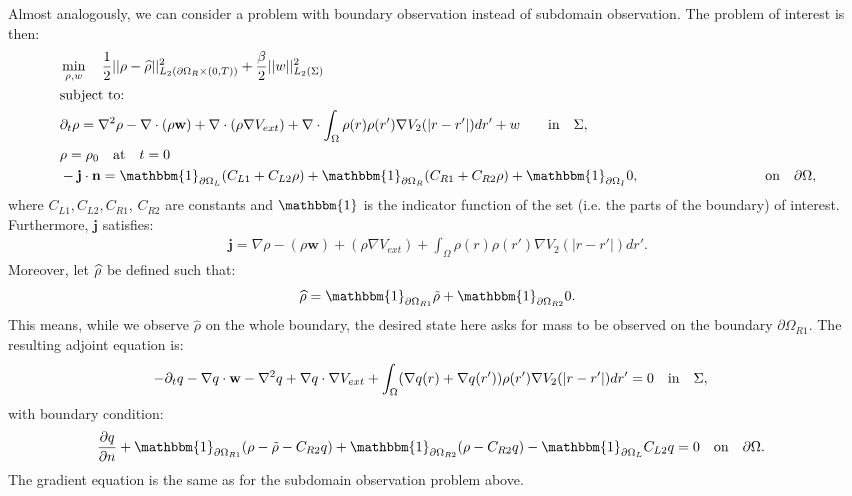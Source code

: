 
Almost analogously, we can consider a problem with boundary observation instead of subdomain observation.
The problem of interest is then:
\begin{align*}
&\min_{\Sta, w} \quad \frac{1}{2}|| \Sta -\widehat \Sta||^2_{L_2(\partial \Omega_R \times (0,T))} + \frac{\beta}{2}||w||^2_{L_2(\Sigma)}\\
&\text{subject to:}\\
&\partial_t \rho = \nabla^2 \rho - \nabla \cdot (\rho \mathbf{w}) +\nabla \cdot (\rho \nabla V_{ext}) + \nabla \cdot \int_\Omega \rho(r) \rho(r') \nabla V_2(|r-r'|) dr' + w \quad  \quad\text{in} \quad \Sigma,\notag\\
& \rho = \rho_0 \quad \text{at} \quad t=0 \notag\\
& - \mathbf{j} \cdot \nor = \mathbbm{1}_{\partial \Omega_L}( C_{L1}  + C_{L2}\Sta) +\mathbbm{1}_{\partial \Omega_R} ( C_{R1}  + C_{R2}\Sta) +\mathbbm{1}_{\partial \Omega_I} 0, \quad \qquad \qquad \qquad \quad \quad\text{on} \quad \partial \Omega, 
\end{align*}
where $C_{L1}, C_{L2}, C_{R1}$, $C_{R2}$ are constants and $\mathbbm{1}$ is the indicator function of the set (i.e. the parts of the boundary) of interest.
Furthermore, $\mathbf{j}$ satisfies:
\begin{align*}
\mathbf{j}=\nabla \rho - (\rho \mathbf{w}) +(\rho \nabla V_{ext}) +  \int_\Omega \rho(r) \rho(r') \nabla V_2(|r-r'|) dr'.
\end{align*}
Moreover, let $\widehat {\rho}$ be defined such that:
\begin{align*}
\widehat \Sta = \mathbbm{1}_{\partial \Omega_{R1}} \tilde \Sta  +\mathbbm{1}_{\partial \Omega_{R2}} 0.
\end{align*}
This means, while we observe $\widehat \rho$ on the whole boundary, the desired state here asks for mass to be observed on the boundary $\partial \Omega_{R1}$.
The resulting adjoint equation is:
\begin{align*}
- \partial_t  q  - \nabla q \cdot \mathbf{w} - \nabla^2 q \notag 
+  \nabla q \cdot \nabla V_{ext}  \notag 
+ \int_\Omega (\nabla  q(r)+\nabla  q(r')) \rho(r') \nabla V_2(|r-r'|) dr' &=0 \quad \text{in} \quad \Sigma, 
\end{align*}
with boundary condition:
\begin{align*}
\frac{\partial \Adjb }{\partial n}+ \mathbbm{1}_{\partial \Omega_{R1}}(\rho- \tilde{\rho} -C_{R2} \Adjb) + \mathbbm{1}_{\partial \Omega_{R2}} (\Sta-C_{R2} \Adjb) - \mathbbm{1}_{\partial \Omega_L} C_{L2} \Adjb   &=0 \quad \text{on} \quad \partial \Omega.
\end{align*}
The gradient equation is the same as for the subdomain observation problem above.
